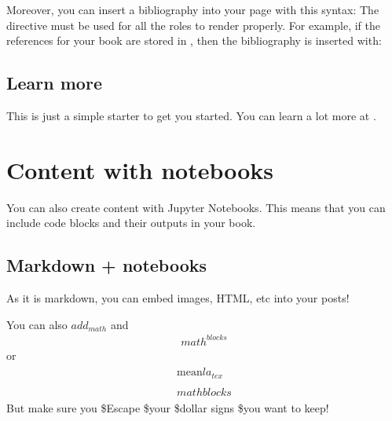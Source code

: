 \documentclass[letterpaper,10pt,english]{jupyterBook}
\begin{document}
\sphinxAtStartPar
Moreover, you can insert a bibliography into your page with this syntax:
The  directive must be used for all the  roles to
render properly.
For example, if the references for your book are stored in ,
then the bibliography is inserted with:


\section{Learn more}
\label{\detokenize{markdown:learn-more}}
\sphinxAtStartPar
This is just a simple starter to get you started.
You can learn a lot more at .

\sphinxstepscope


\chapter{Content with notebooks}
\label{\detokenize{notebooks:content-with-notebooks}}\label{\detokenize{notebooks::doc}}
\sphinxAtStartPar
You can also create content with Jupyter Notebooks. This means that you can include
code blocks and their outputs in your book.


\section{Markdown + notebooks}
\label{\detokenize{notebooks:markdown-notebooks}}
\sphinxAtStartPar
As it is markdown, you can embed images, HTML, etc into your posts!

\sphinxAtStartPar
{}

\sphinxAtStartPar
You can also \(add_{math}\) and
\begin{equation*}
\begin{split}
math^{blocks}
\end{split}
\end{equation*}
\sphinxAtStartPar
or
\begin{equation*}
\begin{split}
\begin{aligned}
\mbox{mean} la_{tex} \\ \\
math blocks
\end{aligned}
\end{split}
\end{equation*}
\sphinxAtStartPar
But make sure you \$Escape \$your \$dollar signs \$you want to keep!
\end{document}
